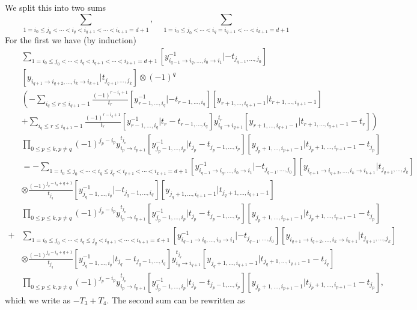 We split this into two sums
\[
\sum_{1=i_0\leq j_0<\cdots<i_q<i_{q+1}<\cdots<i_{k+1}=d+1},\quad\sum_{1=i_0\leq j_0<\cdots<i_q=i_{q+1}<\cdots<i_{k+1}=d+1}
\]
For the first we have (by induction)
\begin{align*}
&\sum_{1=i_0\leq j_0<\cdots<i_q< i_{q+1}<\cdots<i_{k+1}=d+1}[y_{i_{q-1}\to i_q,\dots,i_0\to i_1}^{-1}|-t_{j_{q-1},\dots,j_0}]\\
&[y_{i_{q+1}\to i_{q+2},\dots,i_k\to i_{k+1}}|t_{j_{q+1},\dots,j_k}]\otimes(-1)^q\\
&\left(-\sum_{i_q\leq r\leq i_{q+1}-1}\frac{(-1)^{r-i_q+1}}{t_r}[y_{r-1,\dots,i_q}^{-1}|-t_{r-1,\dots,i_q}][y_{r+1,\dots,i_{q+1}-1}|t_{r+1,\dots,i_{q+1}-1}]\right.\\
&+\left.\sum_{i_q\leq r\leq i_{q+1}-1}\frac{(-1)^{r-i_q+1}}{t_r}[y_{r-1,\dots,i_q}^{-1}|t_r-t_{r-1,\dots,i_q}]y_{i_q\to i_{q+1}}^{t_r}[y_{r+1,\dots,i_{q+1}-1}|t_{r+1,\dots,i_{q+1}-1}-t_r]
\right)\\
&\prod_{0\leq p\leq k,p\neq q}(-1)^{j_p-i_p}y_{i_p\to i_{p+1}}^{t_{j_p}}[y_{j_p-1,\dots,i_p}^{-1}|t_{j_p}-t_{j_p-1,\dots,i_p}][y_{j_p+1,\dots,i_{p+1}-1}|t_{j_p+1,\dots,i_{p+1}-1}-t_{j_p}]\\
&=-\sum_{1=i_0\leq j_0<\cdots<i_q\leq j_q<i_{q+1}<\cdots<i_{k+1}=d+1}[y_{i_{q-1}\to i_q,\dots,i_0\to i_1}^{-1}|-t_{j_{q-1},\dots,j_0}][y_{i_{q+1}\to i_{q+2},\dots,i_k\to i_{k+1}}|t_{j_{q+1},\dots,j_k}]\\
&\otimes\frac{(-1)^{j_q-i_q+q+1}}{t_{j_q}}[y_{j_q-1,\dots,i_q}^{-1}|-t_{j_q-1,\dots,i_q}][y_{j_q+1,\dots,i_{q+1}-1}|t_{j_q+1,\dots,i_{q+1}-1}]\\
&\prod_{0\leq p\leq k,p\neq q}(-1)^{j_p-i_p}y_{i_p\to i_{p+1}}^{t_{j_p}}[y_{j_p-1,\dots,i_p}^{-1}|t_{j_p}-t_{j_p-1,\dots,i_p}][y_{j_p+1,\dots,i_{p+1}-1}|t_{j_p+1,\dots,i_{p+1}-1}-t_{j_p}]\\
+&\sum_{1=i_0\leq j_0<\cdots<i_q\leq j_q<i_{q+1}<\cdots<i_{k+1}=d+1}[y_{i_{q-1}\to i_q,\dots,i_0\to i_1}^{-1}|-t_{j_{q-1},\dots,j_0}][y_{i_{q+1}\to i_{q+2},\dots,i_k\to i_{k+1}}|t_{j_{q+1},\dots,j_k}]\\
&\otimes\frac{(-1)^{j_q-i_q+q+1}}{t_{j_q}}[y_{j_q-1,\dots,i_q}^{-1}|t_{j_q}-t_{j_q-1,\dots,i_q}]y_{i_q\to i_{q+1}}^{t_{j_q}}[y_{j_q+1,\dots,i_{q+1}-1}|t_{j_q+1,\dots,i_{q+1}-1}-t_{j_q}]\\
&\prod_{0\leq p\leq k,p\neq q}(-1)^{j_p-i_p}y_{i_p\to i_{p+1}}^{t_{j_p}}[y_{j_p-1,\dots,i_p}^{-1}|t_{j_p}-t_{j_p-1,\dots,i_p}][y_{j_p+1,\dots,i_{p+1}-1}|t_{j_p+1,\dots,i_{p+1}-1}-t_{j_p}],
\end{align*}
which we write as $-T_3+T_4$. The second sum can be rewritten as
